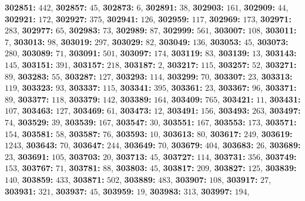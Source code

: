 \textsf{\bfseries 302851:} $442$, \textsf{\bfseries 302857:} $45$, \textsf{\bfseries 302873:} $6$, \textsf{\bfseries 302891:} $38$, \textsf{\bfseries 302903:} $161$, \textsf{\bfseries 302909:} $44$, \textsf{\bfseries 302921:} $172$, \textsf{\bfseries 302927:} $375$, \textsf{\bfseries 302941:} $126$, \textsf{\bfseries 302959:} $117$, \textsf{\bfseries 302969:} $173$, \textsf{\bfseries 302971:} $283$, \textsf{\bfseries 302977:} $65$, \textsf{\bfseries 302983:} $73$, \textsf{\bfseries 302989:} $87$, \textsf{\bfseries 302999:} $561$, \textsf{\bfseries 303007:} $108$, \textsf{\bfseries 303011:} $7$, \textsf{\bfseries 303013:} $98$, \textsf{\bfseries 303019:} $297$, \textsf{\bfseries 303029:} $82$, \textsf{\bfseries 303049:} $136$, \textsf{\bfseries 303053:} $45$, \textsf{\bfseries 303073:} $280$, \textsf{\bfseries 303089:} $71$, \textsf{\bfseries 303091:} $501$, \textsf{\bfseries 303097:} $174$, \textsf{\bfseries 303119:} $83$, \textsf{\bfseries 303139:} $13$, \textsf{\bfseries 303143:} $145$, \textsf{\bfseries 303151:} $391$, \textsf{\bfseries 303157:} $218$, \textsf{\bfseries 303187:} $2$, \textsf{\bfseries 303217:} $115$, \textsf{\bfseries 303257:} $52$, \textsf{\bfseries 303271:} $89$, \textsf{\bfseries 303283:} $55$, \textsf{\bfseries 303287:} $127$, \textsf{\bfseries 303293:} $114$, \textsf{\bfseries 303299:} $70$, \textsf{\bfseries 303307:} $23$, \textsf{\bfseries 303313:} $119$, \textsf{\bfseries 303323:} $93$, \textsf{\bfseries 303337:} $115$, \textsf{\bfseries 303341:} $395$, \textsf{\bfseries 303361:} $23$, \textsf{\bfseries 303367:} $96$, \textsf{\bfseries 303371:} $89$, \textsf{\bfseries 303377:} $118$, \textsf{\bfseries 303379:} $142$, \textsf{\bfseries 303389:} $164$, \textsf{\bfseries 303409:} $765$, \textsf{\bfseries 303421:} $11$, \textsf{\bfseries 303431:} $107$, \textsf{\bfseries 303463:} $127$, \textsf{\bfseries 303469:} $61$, \textsf{\bfseries 303473:} $12$, \textsf{\bfseries 303491:} $156$, \textsf{\bfseries 303493:} $263$, \textsf{\bfseries 303497:} $74$, \textsf{\bfseries 303529:} $39$, \textsf{\bfseries 303539:} $167$, \textsf{\bfseries 303547:} $30$, \textsf{\bfseries 303551:} $167$, \textsf{\bfseries 303553:} $173$, \textsf{\bfseries 303571:} $154$, \textsf{\bfseries 303581:} $58$, \textsf{\bfseries 303587:} $76$, \textsf{\bfseries 303593:} $10$, \textsf{\bfseries 303613:} $80$, \textsf{\bfseries 303617:} $249$, \textsf{\bfseries 303619:} $1243$, \textsf{\bfseries 303643:} $70$, \textsf{\bfseries 303647:} $244$, \textsf{\bfseries 303649:} $70$, \textsf{\bfseries 303679:} $404$, \textsf{\bfseries 303683:} $26$, \textsf{\bfseries 303689:} $23$, \textsf{\bfseries 303691:} $105$, \textsf{\bfseries 303703:} $20$, \textsf{\bfseries 303713:} $45$, \textsf{\bfseries 303727:} $114$, \textsf{\bfseries 303731:} $356$, \textsf{\bfseries 303749:} $153$, \textsf{\bfseries 303767:} $71$, \textsf{\bfseries 303781:} $88$, \textsf{\bfseries 303803:} $45$, \textsf{\bfseries 303817:} $209$, \textsf{\bfseries 303827:} $125$, \textsf{\bfseries 303839:} $140$, \textsf{\bfseries 303859:} $433$, \textsf{\bfseries 303871:} $502$, \textsf{\bfseries 303889:} $483$, \textsf{\bfseries 303907:} $108$, \textsf{\bfseries 303917:} $27$, \textsf{\bfseries 303931:} $321$, \textsf{\bfseries 303937:} $45$, \textsf{\bfseries 303959:} $19$, \textsf{\bfseries 303983:} $313$, \textsf{\bfseries 303997:} $194$, 
